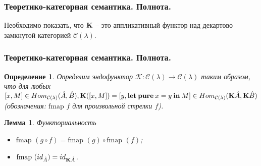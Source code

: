 \documentclass[10pt,pdf,utf8,russian,aspectratio=169]{beamer}
\newtheorem{defin}{Определение}
\newtheorem{lem}{Лемма}
\begin{document}
\begin{frame}
  \frametitle{Теоретико-категорная семантика. Полнота.}

Необходимо показать, что ${\bf K}$ -- это аппликативный функтор над декартово замкнутой категорией $\mathcal{C}(\lambda)$.

\end{frame}

\begin{frame}
  \frametitle{Теоретико-категорная семантика. Полнота.}

  \begin{defin}
    Определим эндофунктор $\mathcal{K} : \mathcal{C}(\lambda) \to \mathcal{C}(\lambda)$ таким образом, что
  для любых $[x,M] \in Hom_{\mathcal{C}(\lambda)}(\hat{A},\hat{B}), {\bf K}([x,M]) = [y, {\bf let \: pure \:} x = y {\: \bf in \:} M] \in Hom_{\mathcal{C}(\lambda)}({\bf K} \hat{A}, {\bf K} \hat{B})$
  (обозначения: $\text{fmap } f$ для произвольной стрелки $f$).

  \end{defin}

  \begin{lem} Функториальность

  \begin{itemize}
    \item $\text{fmap }(g \circ f) = \text{fmap }(g) \circ \text{fmap }(f)$;
    \item $\text{fmap }(id_{\hat{A}}) = id_{{\bf K}\hat{A}}$.
  \end{itemize}
  \end{lem}

\end{frame}
\end{document}
